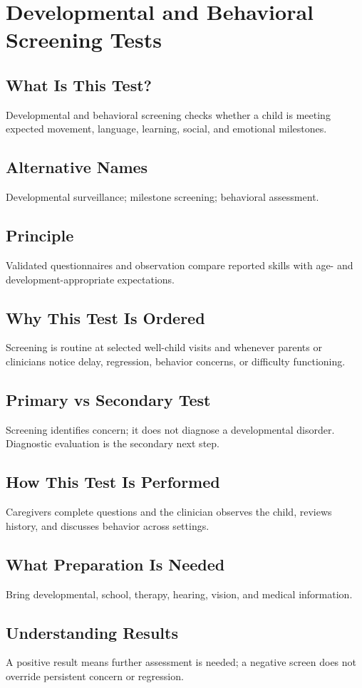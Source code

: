 \chapter{Developmental and Behavioral Screening Tests}
\section*{What Is This Test?} Developmental and behavioral screening checks whether a child is meeting expected movement, language, learning, social, and emotional milestones.
\section*{Alternative Names} Developmental surveillance; milestone screening; behavioral assessment.
\section*{Principle} Validated questionnaires and observation compare reported skills with age- and development-appropriate expectations.
\section*{Why This Test Is Ordered} Screening is routine at selected well-child visits and whenever parents or clinicians notice delay, regression, behavior concerns, or difficulty functioning.
\section*{Primary vs Secondary Test} Screening identifies concern; it does not diagnose a developmental disorder. Diagnostic evaluation is the secondary next step.
\section*{How This Test Is Performed} Caregivers complete questions and the clinician observes the child, reviews history, and discusses behavior across settings.
\section*{What Preparation Is Needed} Bring developmental, school, therapy, hearing, vision, and medical information.
\section*{Understanding Results} A positive result means further assessment is needed; a negative screen does not override persistent concern or regression.
